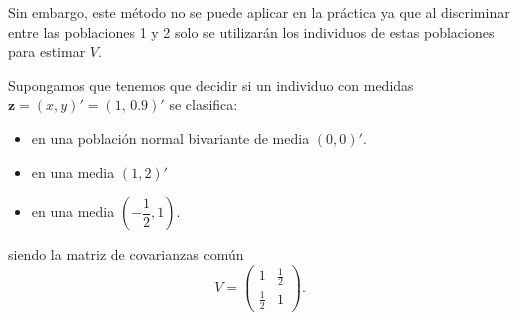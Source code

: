 Sin embargo, este método no se puede aplicar en la práctica ya que al discriminar entre las poblaciones 1 y 2 solo se utilizarán los individuos de estas poblaciones para estimar $V$.

\Ej

Supongamos que tenemos que decidir si un individuo con medidas $\mathbf{z}=(x,y)'=(1,\,0.9)'$ se clasifica:
\begin{itemize}
\item en una población normal bivariante de media $(0,0)'$.
\item en una media $(1,2)'$
\item en una media $\left(-\dfrac{1}{2}, 1\right)$. 
\end{itemize}
siendo la matriz de covarianzas común \[ V=\begin{pmatrix}
1 & \tfrac{1}{2}\\
\tfrac{1}{2} & 1
\end{pmatrix}. \]

